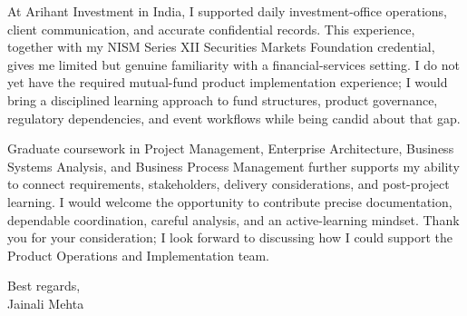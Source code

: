 \documentclass[letterpaper,11pt]{article}
\begin{document}
\bigbreak
At Arihant Investment in India, I supported daily investment-office operations, client communication, and accurate confidential records. This experience, together with my NISM Series XII Securities Markets Foundation credential, gives me limited but genuine familiarity with a financial-services setting. I do not yet have the required mutual-fund product implementation experience; I would bring a disciplined learning approach to fund structures, product governance, regulatory dependencies, and event workflows while being candid about that gap.

\bigbreak
Graduate coursework in Project Management, Enterprise Architecture, Business Systems Analysis, and Business Process Management further supports my ability to connect requirements, stakeholders, delivery considerations, and post-project learning. I would welcome the opportunity to contribute precise documentation, dependable coordination, careful analysis, and an active-learning mindset. Thank you for your consideration; I look forward to discussing how I could support the Product Operations and Implementation team.

\bigbreak
Best regards,\\
Jainali Mehta
\end{document}
